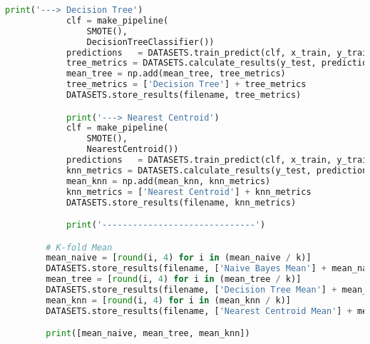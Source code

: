 \begin{lstlisting}[language=Python, caption={Calculate Metrics from Confusion 
Matrix to compare in-fold results after applying over-sampling filter}, 
label={lst:metrics-kfold-oversampling}]
            print('---> Decision Tree')
            clf = make_pipeline(
                SMOTE(),
                DecisionTreeClassifier())
            predictions   = DATASETS.train_predict(clf, x_train, y_train, x_test)
            tree_metrics = DATASETS.calculate_results(y_test, predictions)
            mean_tree = np.add(mean_tree, tree_metrics)
            tree_metrics = ['Decision Tree'] + tree_metrics
            DATASETS.store_results(filename, tree_metrics)

            print('---> Nearest Centroid')
            clf = make_pipeline(
                SMOTE(),
                NearestCentroid())
            predictions   = DATASETS.train_predict(clf, x_train, y_train, x_test)
            knn_metrics = DATASETS.calculate_results(y_test, predictions)
            mean_knn = np.add(mean_knn, knn_metrics)
            knn_metrics = ['Nearest Centroid'] + knn_metrics
            DATASETS.store_results(filename, knn_metrics)

            print('------------------------------')

        # K-fold Mean
        mean_naive = [round(i, 4) for i in (mean_naive / k)]
        DATASETS.store_results(filename, ['Naive Bayes Mean'] + mean_naive)
        mean_tree = [round(i, 4) for i in (mean_tree / k)]
        DATASETS.store_results(filename, ['Decision Tree Mean'] + mean_tree)
        mean_knn = [round(i, 4) for i in (mean_knn / k)]
        DATASETS.store_results(filename, ['Nearest Centroid Mean'] + mean_knn)

        print([mean_naive, mean_tree, mean_knn])

\end{lstlisting}

\cleardoublepage
